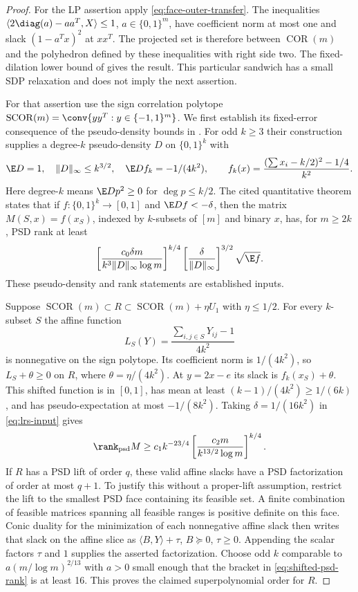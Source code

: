 \begin{proof}
For the LP assertion apply \eqref{eq:face-outer-transfer}. The inequalities
$\langle2\diag(a)-aa^T,X\rangle\le1$, $a\in\{0,1\}^m$, have coefficient
norm at most one and slack $(1-a^Tx)^2$ at $xx^T$. The projected set is
therefore between $\operatorname{COR}(m)$ and the polyhedron defined by
these inequalities with right side two. The fixed-dilation lower bound of
\citet[Theorem 6(i), author version p.\ 18]{BraunEtAl2015} gives the result.
This particular sandwich has a small SDP relaxation and does not imply
the next assertion.

For that assertion use the sign correlation polytope
$\operatorname{SCOR}(m)=\conv\{yy^T:y\in\{-1,1\}^m\}$.
We first establish its fixed-error consequence of the pseudo-density
bounds in \citet[Theorem 3.8, equation (3.11), and Theorem 5.3]{LRS2015}.
For odd $k\ge3$ their construction supplies a degree-$k$ pseudo-density
$D$ on $\{0,1\}^k$ with
\[
 \E D=1,\quad\|D\|_\infty\le k^{3/2},\quad
 \E Df_k=-1/(4k^2),\qquad
 f_k(x)=\frac{(\sum x_i-k/2)^2-1/4}{k^2}.
\]
Here degree-$k$ means $\E Dp^2\ge0$ for $\deg p\le k/2$.
The cited quantitative theorem states that if $f:\{0,1\}^k\to[0,1]$
and $\E Df<-\delta$, then the matrix $M(S,x)=f(x_S)$, indexed by
$k$-subsets of $[m]$ and binary $x$, has, for $m\ge2k$, PSD rank at least
\begin{equation}\label{eq:lrs-input}
 \left[\frac{c_0\delta m}{k^3\|D\|_\infty\log m}\right]^{k/4}
 \left[\frac{\delta}{\|D\|_\infty}\right]^{3/2}\sqrt{\E f}.
\end{equation}
These pseudo-density and rank statements are established inputs.

Suppose $\operatorname{SCOR}(m)\subset R\subset
\operatorname{SCOR}(m)+\eta U_1$ with $\eta\le1/2$.
For every $k$-subset $S$ the affine function
\[
 L_S(Y)=\frac{\sum_{i,j\in S}Y_{ij}-1}{4k^2}
\]
is nonnegative on the sign polytope. Its coefficient norm is $1/(4k^2)$,
so $L_S+\theta\ge0$ on $R$, where $\theta=\eta/(4k^2)$.
At $y=2x-e$ its slack is $f_k(x_S)+\theta$. This shifted function is
in $[0,1]$, has mean at least $(k-1)/(4k^2)\ge1/(6k)$, and has
pseudo-expectation at most $-1/(8k^2)$. Taking $\delta=1/(16k^2)$
in \eqref{eq:lrs-input} gives
\begin{equation}\label{eq:shifted-psd-rank}
 \rank_{\rm psd}M\ge c_1k^{-23/4}
 \left[\frac{c_2m}{k^{13/2}\log m}\right]^{k/4}.
\end{equation}
If $R$ has a PSD lift of order $q$, these valid affine slacks have a PSD
factorization of order at most $q+1$. To justify this without a proper-lift
assumption, restrict the lift to the smallest PSD face containing its
feasible set. A finite combination of feasible matrices spanning all
feasible ranges is positive definite on this face. Conic duality for the
minimization of each nonnegative affine slack then writes that slack on
the affine slice as $\langle B,Y\rangle+\tau$, $B\succeq0$, $\tau\ge0$.
Appending the scalar factors $\tau$ and $1$ supplies the asserted
factorization. Choose odd $k$ comparable to
$a(m/\log m)^{2/13}$ with $a>0$ small enough that the bracket in
\eqref{eq:shifted-psd-rank} is at least 16. This proves the claimed
superpolynomial order for $R$.


\end{proof}
